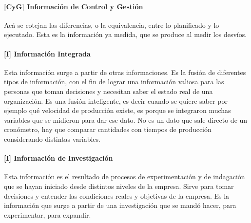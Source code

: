 \hypertarget{informaciuxf3n-de-control-y-gestiuxf3n}{%
\paragraph{[CyG] Información de Control y
Gestión}\label{informaciuxf3n-de-control-y-gestiuxf3n}}
Acá se cotejan las diferencias, o la equivalencia, entre lo planificado
y lo ejecutado. Esta es la información ya medida, que se produce al
medir los desvíos.

\hypertarget{informaciuxf3n-integrada}{%
\paragraph{[I] Información Integrada}\label{informaciuxf3n-integrada}}
Esta información surge a partir de otras informaciones. Es la fusión de
diferentes tipos de información, con el fin de lograr una información
valiosa para las personas que toman decisiones y necesitan saber el
estado real de una organización. Es una fusión inteligente, es decir
cuando se quiere saber por ejemplo qué velocidad de producción existe,
es porque se integraron muchas variables que se midieron para dar ese
dato. No es un dato que sale directo de un cronómetro, hay que comparar
cantidades con tiempos de producción considerando distintas variables.

\hypertarget{informaciuxf3n-de-investigaciuxf3n}{%
\paragraph{[I] Información de
Investigación}\label{informaciuxf3n-de-investigaciuxf3n}}
Esta información es el resultado de procesos de experimentación y de
indagación que se hayan iniciado desde distintos niveles de la empresa.
Sirve para tomar decisiones y entender las condiciones reales y
objetivas de la empresa. Es la información que surge a partir de una
investigación que se mandó hacer, para experimentar, para expandir.

\onecolumn

